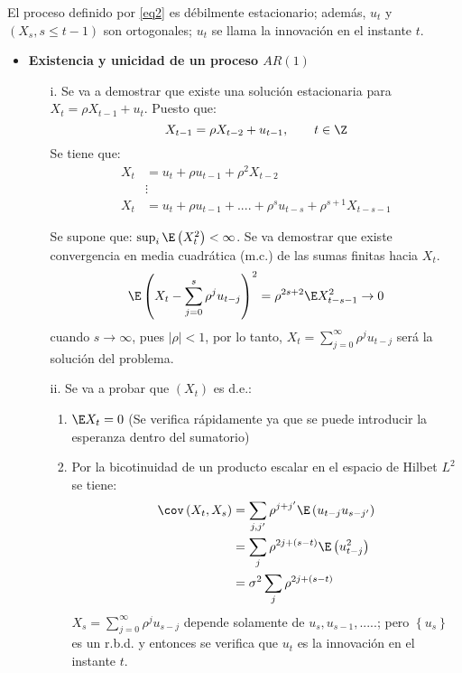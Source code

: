 El proceso definido por \eqref{eq2} es d\'{e}bilmente estacionario; adem\'{a}s, $u_{t} $ y $\left( {X_{s}, s\le t-1} \right)$ son ortogonales; $u_{t} $ se llama la innovaci\'{o}n en el instante $t$.

\begin{itemize}
\item \textbf{Existencia y unicidad de un proceso $AR(1)$}
	\begin{enumerate}
	\item[i.] Se va a demostrar que existe una soluci\'{o}n estacionaria para $X_{t} =\rho X_{t-1} +u_{t} $. Puesto que:
	\[
		X_{t-1} =\rho X_{t-2} +u_{t-1}, \qquad t\in \Z
	\]
	Se tiene que:
	\begin{align*}
	X_{t} &=u_{t} +\rho u_{t-1} +\rho^{2}X_{t-2} \\ 
		 &\vdots \\ 
	X_{t} &=u_{t} +\rho u_{t-1} +....+\rho^{s}u_{t-s} +\rho^{s+1}X_{t-s-1}
	\end{align*}
	
	Se supone que: $\sup_i\E\left(X_{t}^{2} \right)<\infty$. Se va demostrar que existe convergencia en media cuadr\'{a}tica (m.c.) de las sumas finitas hacia $X_{t}$. 
	\[
	 \E\left( {X_{t} -\sum_{j=0}^s {\rho^{j}u_{t-j} } } \right)^{2}=\rho^{2s+2}\E X_{t-s-1}^{2} \to 0
	\]
	cuando $s\to \infty$, pues $\left| \rho \right|<1$, por lo tanto, $X_{t} =\sum_{j=0}^\infty {\rho^{j}u_{t-j} } $ ser\'{a} la soluci\'{o}n del problema.

	\item[ii.] Se va a probar que $\left( {X_{t} } \right)$ es d.e.:
	\begin{enumerate}
		\item $\E X_{t} =0$ (Se verifica r\'{a}pidamente ya que se puede introducir la esperanza dentro del sumatorio)
		\item Por la bicotinuidad de un producto escalar en el espacio de Hilbet $L^{2}$ se tiene: 
		\begin{align*}
		 \cov\left( {X_{t} ,X_{s} } \right)
			 &=\sum_{j,j'} {\rho^{j+j'}} \E\left( {u_{t-j} u_{s-j'} } \right)\\
			 &=\sum_j {\rho^{2j+\left( {s-t} \right)}\E\left( {u_{t-j}^{2} }\right)}\\ &=\sigma^{2}\sum_j {\rho^{2j+(s-t)}} 
		\end{align*}
		$\displaystyle X_{s} =\sum_{j=0}^\infty {\rho^{j}u_{s-j} } $ depende solamente de $u_{s} ,u_{s-1} ,.....$; pero $\left\{ {u_{s} } \right\}$ es un r.b.d. y entonces se verifica que $u_{t} $ es la innovaci\'{o}n en el instante $t.$
	\end{enumerate}
	\end{enumerate}


\end{itemize}
